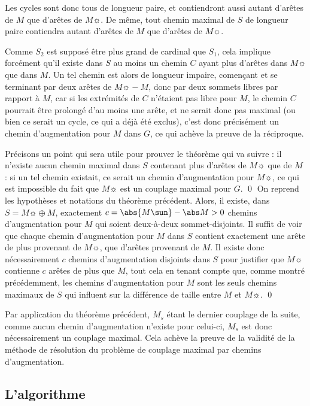     Les cycles sont donc tous de longueur paire, et contiendront aussi autant d'arêtes de $M$ que d'arêtes de $M\sun$. De même, tout chemin maximal de $S$ de longueur paire contiendra autant d'arêtes de $M$ que d'arêtes de $M\sun$.
    
    Comme $S_2$ est supposé être plus grand de cardinal que $S_1$, cela implique forcément qu'il existe dans $S$ au moins un chemin $C$ ayant plus d'arêtes dans $M\sun$ que dans $M$. Un tel chemin est alors de longueur impaire, començant et se terminant par deux arêtes de $M\sun \minus M$, donc par deux sommets libres par rapport à $M$, car si les extrémités de $C$ n'étaient pas libre pour $M$, le chemin $C$ pourrait être prolongé d'au moins une arête, et ne serait donc pas maximal (ou bien ce serait un cycle, ce qui a déjà été exclus), c'est donc précisément un chemin d'augmentation pour $M$ dans $G$, ce qui achève la preuve de la réciproque.
    
    Précisons un point qui sera utile pour prouver le théorème qui va suivre : il n'existe aucun chemin maximal dans $S$ contenant plus d'arêtes de $M\sun$ que de $M$ : si un tel chemin existait, ce serait un chemin d'augmentation pour $M\sun$, ce qui est impossible du fait que $M\sun$ est un couplage maximal pour $G$.
 \qed\SEP
  On reprend les hypothèses et notations du théorème précédent. Alors, il existe, dans $S = M\sun \oplus M$, exactement $c = \abs {M\sun} - \abs M > 0$ chemins d'augmentation pour $M$ qui soient deux-à-deux sommet-disjoints.
 \SEP\jpreuve
    Il suffit de voir que chaque chemin d'augmentation pour $M$ dans $S$ contient exactement une arête de plus provenant de $M\sun$, que d'arêtes provenant de $M$. Il existe donc nécessairement $c$ chemins d'augmentation disjoints dans $S$ pour justifier que $M\sun$ contienne $c$ arêtes de plus que $M$, tout cela en tenant compte que, comme montré précédemment, les chemins d'augmentation pour $M$ sont les seuls chemins maximaux de $S$ qui influent sur la différence de taille entre $M$ et $M\sun$.
 \qed \SEP
 
 Par application du théorème précédent, $M_s$ étant le dernier couplage de la suite, comme aucun chemin d'augmentation n'existe pour celui-ci, $M_s$ est donc nécessairement un couplage maximal. Cela achève la preuve de la validité de la méthode de résolution du problème de couplage maximal par chemins d'augmentation.
 
 \subsection{L'algorithme}
 

